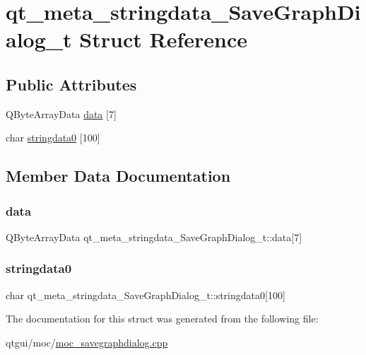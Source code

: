 \hypertarget{structqt__meta__stringdata___save_graph_dialog__t}{}\section{qt\+\_\+meta\+\_\+stringdata\+\_\+\+Save\+Graph\+Dialog\+\_\+t Struct Reference}
\label{structqt__meta__stringdata___save_graph_dialog__t}
\subsection*{Public Attributes}
\begin{DoxyCompactItemize}
\item 
Q\+Byte\+Array\+Data \mbox{\hyperlink{structqt__meta__stringdata___save_graph_dialog__t_a418cb5adae947384ef91e1744e2c0ed8}{data}} \mbox{[}7\mbox{]}
\item 
char \mbox{\hyperlink{structqt__meta__stringdata___save_graph_dialog__t_a89420a52618f08d7c7ea8ce3fee1be8e}{stringdata0}} \mbox{[}100\mbox{]}
\end{DoxyCompactItemize}


\subsection{Member Data Documentation}
\mbox{\label{structqt__meta__stringdata___save_graph_dialog__t_a418cb5adae947384ef91e1744e2c0ed8}} 
\subsubsection{\texorpdfstring{data}{data}}
{\footnotesize\ttfamily Q\+Byte\+Array\+Data qt\+\_\+meta\+\_\+stringdata\+\_\+\+Save\+Graph\+Dialog\+\_\+t\+::data\mbox{[}7\mbox{]}}

\mbox{\label{structqt__meta__stringdata___save_graph_dialog__t_a89420a52618f08d7c7ea8ce3fee1be8e}} 
\subsubsection{\texorpdfstring{stringdata0}{stringdata0}}
{\footnotesize\ttfamily char qt\+\_\+meta\+\_\+stringdata\+\_\+\+Save\+Graph\+Dialog\+\_\+t\+::stringdata0\mbox{[}100\mbox{]}}



The documentation for this struct was generated from the following file\+:\begin{DoxyCompactItemize}
\item 
qtgui/moc/\mbox{\hyperlink{moc__savegraphdialog_8cpp}{moc\+\_\+savegraphdialog.\+cpp}}\end{DoxyCompactItemize}
